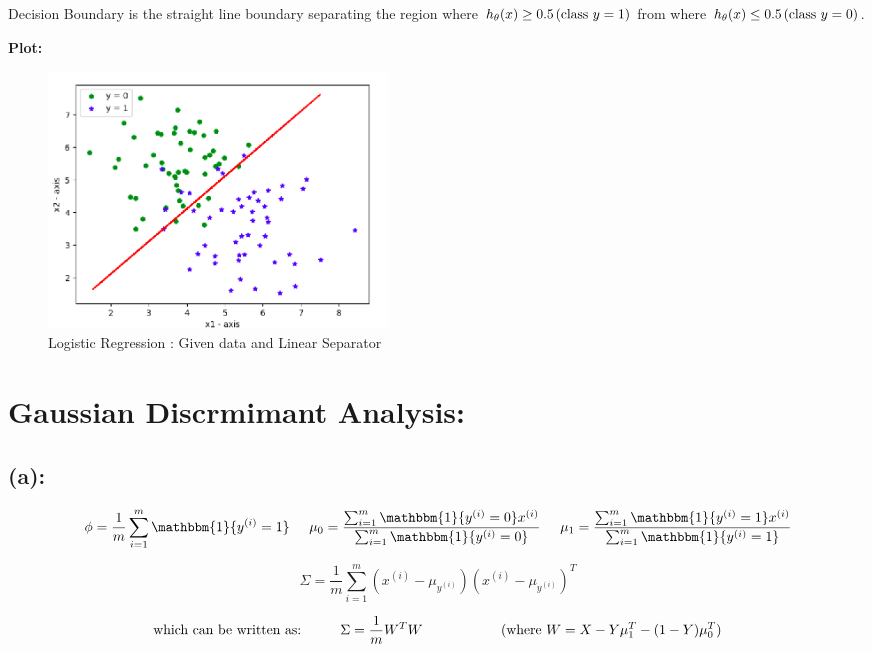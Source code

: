 \documentclass[a4 paper]{article}
\begin{document}
\hspace*{-0.2cm} 
Decision Boundary is the straight line boundary separating the region where $h_\theta(x) \geq 0.5 \hspace*{0.5mm} (\text{class } y=1)$ from
where $h_\theta(x) \leq 0.5 \hspace*{0.5mm} (\text{class } y=0)$.

\vspace*{0.5cm}
\hspace*{-0.2cm} 
\textbf{Plot:}
\begin{figure}[!htb]
	\centering
	  \includegraphics[width = 90mm]{./Plots/3.png}
	  \caption{Logistic Regression : Given data and Linear Separator}
  	\label{fig7}
\end{figure}

\section{Gaussian Discrmimant Analysis:}

\subsection*{(a):}

$$ \phi = \frac{1}{m} \sum_{i=1}^{m} \mathbbm{1}\{y^{(i)}=1\} \hspace*{0.5cm}
\mu_0 = \frac{\sum_{i=1}^{m} \mathbbm{1}\{y^{(i)}=0\} x^{(i)}}{\sum_{i=1}^{m} \mathbbm{1}\{y^{(i)}=0\}} \hspace*{0.5cm}
\mu_1 = \frac{\sum_{i=1}^{m} \mathbbm{1}\{y^{(i)}=1\} x^{(i)}}{\sum_{i=1}^{m} \mathbbm{1}\{y^{(i)}=1\}}  $$

$$ \Sigma = \frac{1}{m} \sum_{i=1}^{m} (x^{(i)}-\mu_{y^{(i)}})(x^{(i)}-\mu_{y^{(i)}})^{T}$$

$$ \text{which can be written as:} \hspace*{1cm} \Sigma = \frac{1}{m} W^T W \hspace*{2cm} (\text{where } W = X - Y\mu_1^T - (1-Y)\mu_0^T) $$
\end{document}
